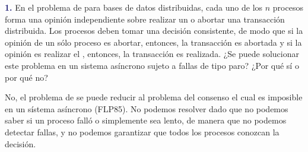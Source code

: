 \newpage\textbf{\textcolor{MidnightBlue}{1.}}
En el problema de  para bases de datos distribuidas, cada uno de los $n$ procesos forma una opinión independiente sobre realizar un  o abortar una transacción distribuida. Los procesos deben tomar una decisión consistente, de modo que si la opinión de un sólo proceso es abortar, entonces, la transacción es abortada y si la opinión es realizar el , entonces, la transacción es realizada. ¿Se puede solucionar este problema en un sistema asíncrono sujeto a fallas de tipo paro? ¿Por qué sí o por qué no?

No, el problema de  se puede reducir al problema del consenso el cual es imposible en un sístema asíncrono (FLP85). No podemos resolver  dado que no podemos saber si un proceso falló o simplemente sea lento, de manera que no podemos detectar fallas, y no podemos garantizar que todos los procesos conozcan la decisión.